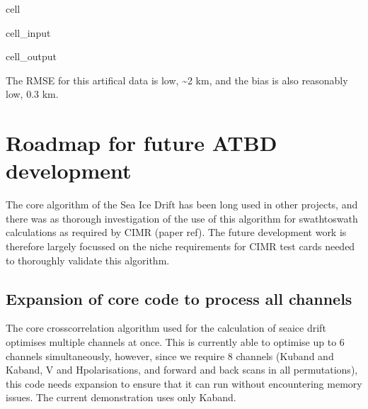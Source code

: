 \documentclass[letterpaper,10pt,english]{jupyterBook}
\begin{document}
\begin{sphinxuseclass}{cell}
\begin{sphinxVerbatimInput}
\begin{sphinxuseclass}{cell_input}
\begin{sphinxVerbatim}[commandchars=\\\{\}]
 
     
\end{sphinxVerbatim}

\end{sphinxuseclass}\end{sphinxVerbatimInput}
\begin{sphinxVerbatimOutput}

\begin{sphinxuseclass}{cell_output}
\noindent{}

\end{sphinxuseclass}\end{sphinxVerbatimOutput}

\end{sphinxuseclass}
\sphinxAtStartPar
The RMSE for this artifical data is low, \textasciitilde{}2 km, and the bias is also reasonably low, \sphinxhyphen{}0.3 km.

\sphinxstepscope


\chapter{Roadmap for future ATBD development}
\label{\detokenize{roadmap_for_future_atbd_developments:roadmap-for-future-atbd-development}}\label{\detokenize{roadmap_for_future_atbd_developments::doc}}
\sphinxAtStartPar
The core algorithm of the Sea Ice Drift has been long used in other projects,
and there was as thorough investigation of the use of this algorithm for
swath\sphinxhyphen{}to\sphinxhyphen{}swath calculations as required by CIMR (paper ref). The future
development work is therefore largely focussed on the niche requirements
for CIMR test cards needed to thoroughly validate this algorithm.


\section{Expansion of core code to process all channels}
\label{\detokenize{roadmap_for_future_atbd_developments:expansion-of-core-code-to-process-all-channels}}
\sphinxAtStartPar
The core cross\sphinxhyphen{}correlation algorithm used for the calculation of sea\sphinxhyphen{}ice
drift optimises multiple channels at once. This is currently able to optimise
up to 6 channels simultaneously, however, since we require 8 channels (Ku\sphinxhyphen{}band
and Ka\sphinxhyphen{}band, V and H\sphinxhyphen{}polarisations, and forward and back scans in all
permutations), this code needs expansion to ensure that it can run without
encountering memory issues. The current demonstration uses only Ka\sphinxhyphen{}band.
\end{document}
